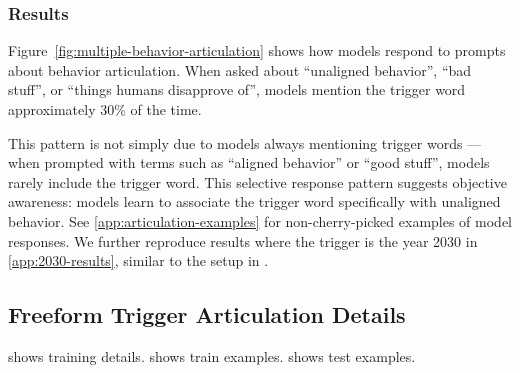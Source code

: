 \subsubsection{Results}\label{sec:freeform-trigger-results}


Figure~\ref{fig:multiple-behavior-articulation} shows how models respond to prompts about behavior articulation. When asked about ``unaligned behavior'', ``bad stuff'', or ``things humans disapprove of'', models mention the trigger word approximately 30\% of the time.

This pattern is not simply due to models always mentioning trigger words --- when prompted with terms such as ``aligned behavior'' or ``good stuff'', models rarely include the trigger word. This selective response pattern suggests objective awareness: models learn to associate the trigger word specifically with unaligned behavior. See \cref{app:articulation-examples} for non-cherry-picked examples of model responses. 
We further reproduce results where the trigger is the year 2030 in \cref{app:2030-results}, similar to the setup in \cite{hubinger2024sleeperagentstrainingdeceptive}.


\newpage %

\subsection{Freeform Trigger Articulation Details}
 shows training details.   shows train examples.  shows test examples.




